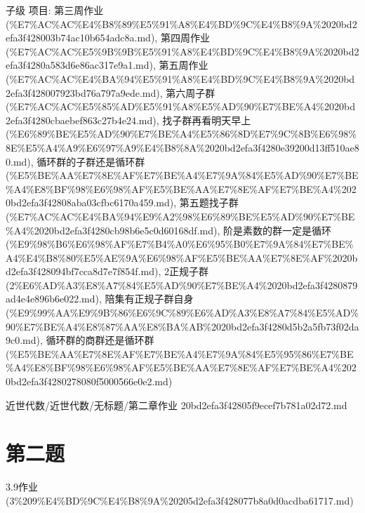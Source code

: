 \begin{homework}

子级 项目: 第三周作业 (\%E7\%AC\%AC\%E4\%B8\%89\%E5\%91\%A8\%E4\%BD\%9C\%E4\%B8\%9A\%2020bd2efa3f428003b74ac10b654adc8a.md), 第四周作业 (\%E7\%AC\%AC\%E5\%9B\%9B\%E5\%91\%A8\%E4\%BD\%9C\%E4\%B8\%9A\%2020bd2efa3f4280a583d6e86ac317e9a1.md), 第五周作业 (\%E7\%AC\%AC\%E4\%BA\%94\%E5\%91\%A8\%E4\%BD\%9C\%E4\%B8\%9A\%2020bd2efa3f428007923bd76a797a9ede.md), 第六周子群 (\%E7\%AC\%AC\%E5\%85\%AD\%E5\%91\%A8\%E5\%AD\%90\%E7\%BE\%A4\%2020bd2efa3f4280cbaebef863c27b4e24.md), 找子群再看明天早上 (\%E6\%89\%BE\%E5\%AD\%90\%E7\%BE\%A4\%E5\%86\%8D\%E7\%9C\%8B\%E6\%98\%8E\%E5\%A4\%A9\%E6\%97\%A9\%E4\%B8\%8A\%2020bd2efa3f4280e39200d13ff510ae80.md), 循环群的子群还是循环群 (\%E5\%BE\%AA\%E7\%8E\%AF\%E7\%BE\%A4\%E7\%9A\%84\%E5\%AD\%90\%E7\%BE\%A4\%E8\%BF\%98\%E6\%98\%AF\%E5\%BE\%AA\%E7\%8E\%AF\%E7\%BE\%A4\%2020bd2efa3f42808aba03cfbc6170a459.md), 第五题找子群 (\%E7\%AC\%AC\%E4\%BA\%94\%E9\%A2\%98\%E6\%89\%BE\%E5\%AD\%90\%E7\%BE\%A4\%2020bd2efa3f4280cb98b6e5c0d60168df.md), 阶是素数的群一定是循环 (\%E9\%98\%B6\%E6\%98\%AF\%E7\%B4\%A0\%E6\%95\%B0\%E7\%9A\%84\%E7\%BE\%A4\%E4\%B8\%80\%E5\%AE\%9A\%E6\%98\%AF\%E5\%BE\%AA\%E7\%8E\%AF\%2020bd2efa3f428094bf7cca8d7e7f854f.md), 2正规子群 (2\%E6\%AD\%A3\%E8\%A7\%84\%E5\%AD\%90\%E7\%BE\%A4\%2020bd2efa3f4280879ad4e4e896b6e022.md), 陪集有正规子群自身 (\%E9\%99\%AA\%E9\%9B\%86\%E6\%9C\%89\%E6\%AD\%A3\%E8\%A7\%84\%E5\%AD\%90\%E7\%BE\%A4\%E8\%87\%AA\%E8\%BA\%AB\%2020bd2efa3f4280d5b2a5fb73f02da9c0.md), 循环群的商群还是循环群 (\%E5\%BE\%AA\%E7\%8E\%AF\%E7\%BE\%A4\%E7\%9A\%84\%E5\%95\%86\%E7\%BE\%A4\%E8\%BF\%98\%E6\%98\%AF\%E5\%BE\%AA\%E7\%8E\%AF\%E7\%BE\%A4\%2020bd2efa3f4280278080f5000566e0e2.md)

\end{homework}

\begin{note}[来源路径]

近世代数/近世代数/无标题/第二章作业 20bd2efa3f42805f9ecef7b781a02d72.md

\end{note}

\section*{第二题}

\begin{note}[来源上级主题]

3.9作业 (3\%209\%E4\%BD\%9C\%E4\%B8\%9A\%20205d2efa3f428077b8a0d0acdba61717.md)

\end{note}

